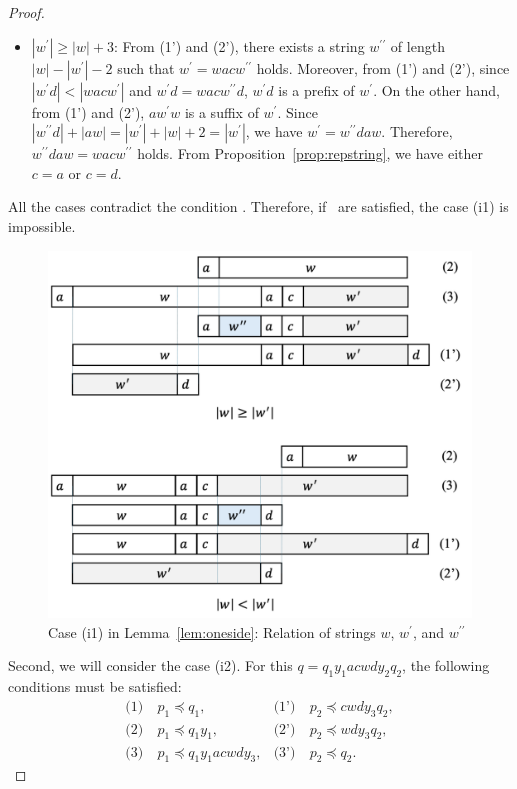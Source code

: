 \begin{proof}
\begin{itemize}
 \item $|w^{\prime}| \ge |w|+3$: From (1') and (2'), there exists a string $w^{\prime\prime}$ of length $|w|-|w^{\prime}|-2$ such that $w^{\prime}=wacw^{\prime\prime}$ holds.
  Moreover, from (1') and (2'), since $|w^{\prime}d| < |wacw^{\prime}|$ and $w^{\prime}d = wacw^{\prime\prime}d$, $w^{\prime}d$ is a prefix of $w^{\prime}$.
  On the other hand, from (1') and (2'), $aw^{\prime}w$ is a suffix of $w^{\prime}$.
  Since $|w^{\prime\prime}d| + |aw| = |w^{\prime}| + |w| + 2 = |w^{\prime}|$, we have $w^{\prime}=w^{\prime\prime}daw$.
  Therefore, $w^{\prime\prime}daw = wacw^{\prime\prime}$ holds.
  From Proposition~\ref{prop:repstring}, we have either $c = a$ or $c = d$.
  \end{itemize}
  All the cases contradict the condition \TheConditionBsub.
  Therefore, if \TheConditionB\ are satisfied, the case (i1) is impossible.

  \begin{figure}[t]
    \begin{center}
      \includegraphics[scale=0.345]{figs/centerproof2.pdf}
      \caption{Case (i1) in Lemma~\ref{lem:oneside}: Relation of strings $w$, $w^{\prime}$, and $w^{\prime\prime}$}\label{fig:centerproof2}
    \end{center}
    \end{figure}

Second, we will consider the case (i2).
For this $q=q_{1}y_{1}acwdy_{2}q_{2}$, the following conditions must be satisfied:
\begin{align*}
  \textrm{(1)}~& p_{1} \preceq q_{1}, & \textrm{(1')}~& p_{2} \preceq cwdy_{3}q_{2}, \\
  \textrm{(2)}~& p_{1} \preceq q_{1}y_{1}, & \textrm{(2')}~& p_{2} \preceq wdy_{3}q_{2}, \\
  \textrm{(3)}~& p_{1} \preceq q_{1}y_{1}acwdy_{3}, & \textrm{(3')}~& p_{2} \preceq q_{2}.
\end{align*}


\end{proof}
